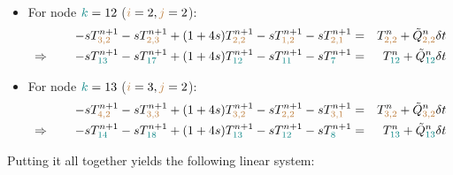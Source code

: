 \begin{itemize}
\item For node ${\color{teal}k}=12$ (${\color{brown}i}=2,{\color{brown}j}=2$):
\begin{eqnarray}
-s T_{{\color{brown} 3,2}}^{n+1}
-s T_{{\color{brown}2,3}}^{n+1} 
+(1+4s)T_{{\color{brown}2,2}}^{n+1} 
-s T_{{\color{brown}1,2}}^{n+1} 
-s T_{{\color{brown}2,1}}^{n+1} 
&=& T_{{\color{brown}2,2}}^n 
+\tilde{Q}_{{\color{brown}2,2}}^n \delta t \nonumber\\
\Rightarrow \qquad
-s T_{{\color{teal} 13}}^{n+1}
-s T_{{\color{teal} 17}}^{n+1} 
+(1+4s)T_{{\color{teal}12}}^{n+1} 
-s T_{{\color{teal}11}}^{n+1} 
-s T_{{\color{teal}7}}^{n+1} 
&=& T_{{\color{teal}12}}^n 
+\tilde{Q}_{{\color{teal}12}}^n\delta t
\end{eqnarray}


\item For node ${\color{teal}k}=13$ (${\color{brown}i}=3,{\color{brown}j}=2$):
\begin{eqnarray}
-s T_{{\color{brown} 4,2}}^{n+1}
-s T_{{\color{brown}3,3}}^{n+1} 
+(1+4s)T_{{\color{brown}3,2}}^{n+1} 
-s T_{{\color{brown}2,2}}^{n+1} 
-s T_{{\color{brown}3,1}}^{n+1} 
&=& T_{{\color{brown}3,2}}^n 
+\tilde{Q}_{{\color{brown}3,2}}^n \delta t\nonumber\\
\Rightarrow \qquad
-s T_{{\color{teal} 14}}^{n+1}
-s T_{{\color{teal} 18}}^{n+1} 
+(1+4s)T_{{\color{teal}13}}^{n+1} 
-s T_{{\color{teal}12}}^{n+1} 
-s T_{{\color{teal}8}}^{n+1} 
&=& T_{{\color{teal}13}}^n 
+\tilde{Q}_{{\color{teal}13}}^n \delta t
\end{eqnarray}


\end{itemize}

Putting it all together yields the following linear system:

